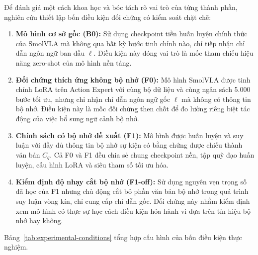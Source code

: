 Để đánh giá một cách khoa học và bóc tách rõ vai trò của từng thành phần, nghiên cứu thiết lập bốn điều kiện đối chứng có kiểm soát chặt chẽ:

\begin{enumerate}
    \item \textbf{Mô hình cơ sở gốc (B0):} Sử dụng checkpoint tiền huấn luyện chính thức của SmolVLA mà không qua bất kỳ bước tinh chỉnh nào, chỉ tiếp nhận chỉ dẫn ngôn ngữ ban đầu $\ell$. Điều kiện này đóng vai trò là mốc tham chiếu hiệu năng zero-shot của mô hình nền tảng.
    \item \textbf{Đối chứng thích ứng không bộ nhớ (F0):} Mô hình SmolVLA được tinh chỉnh LoRA trên Action Expert với cùng bộ dữ liệu và cùng ngân sách 5.000 bước tối ưu, nhưng chỉ nhận chỉ dẫn ngôn ngữ gốc $\ell$ mà không có thông tin bộ nhớ. Điều kiện này là mốc đối chứng then chốt để đo lường riêng biệt tác động của việc bổ sung ngữ cảnh bộ nhớ.
    \item \textbf{Chính sách có bộ nhớ đề xuất (F1):} Mô hình được huấn luyện và suy luận với đầy đủ thông tin bộ nhớ sự kiện có bằng chứng được chiếu thành văn bản $C_q$. Cả F0 và F1 đều chia sẻ chung checkpoint nền, tập quỹ đạo huấn luyện, cấu hình LoRA và siêu tham số tối ưu hóa.
    \item \textbf{Kiểm định độ nhạy cắt bộ nhớ (F1-off):} Sử dụng nguyên vẹn trọng số đã học của F1 nhưng chủ động cắt bỏ phần văn bản bộ nhớ trong quá trình suy luận vòng kín, chỉ cung cấp chỉ dẫn gốc. Đối chứng này nhằm kiểm định xem mô hình có thực sự học cách điều kiện hóa hành vi dựa trên tín hiệu bộ nhớ hay không.
\end{enumerate}

Bảng~\ref{tab:experimental-conditions} tổng hợp cấu hình của bốn điều kiện thực nghiệm.

